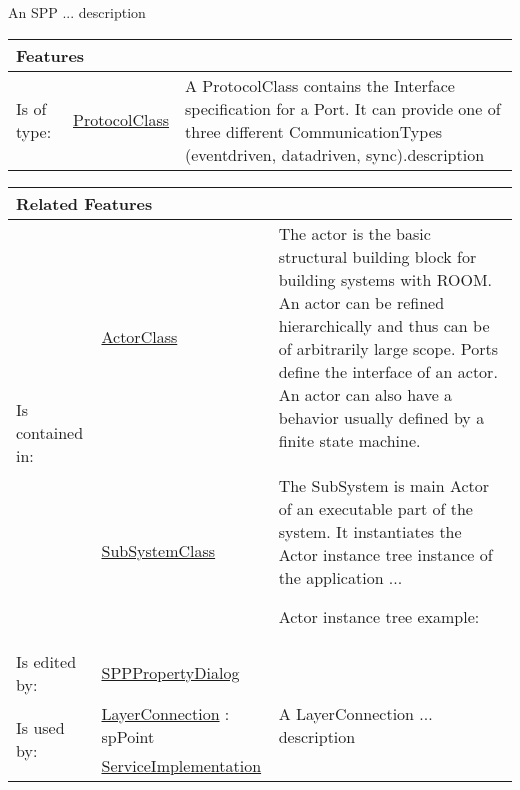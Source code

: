 			An SPP ... description
			
			
			\vspace{\baselineskip}
			\begingroup
			\renewcommand{\arraystretch}{1.8} %
			\parbox{\textwidth}{
			\begin{longtable}{l l p{}}
				\multicolumn{2}{l}{\textbf{\large Features}} & \\
				\hline
			Is of type: & \tabitem \hyperlink{ref:ProtocolClass}{ProtocolClass}  & A ProtocolClass contains the Interface specification for a Port. It can provide one of three different CommunicationTypes (eventdriven, datadriven, sync).description \\
			\hline
			\end{longtable}	
			}
			\endgroup
			\vspace{\baselineskip}
			
			\vspace{\baselineskip}
			\begingroup
			\renewcommand{\arraystretch}{1.8} %
			\parbox{\textwidth}{
			\begin{longtable}{l l p{}}
				\multicolumn{2}{l}{\textbf{\large Related Features}} & \\
				\hline
			\multirow{2}{*}{Is contained in:} & \tabitem \hyperlink{ref:ActorClass}{ActorClass}  & The actor is the basic structural building block for building systems with ROOM. An actor can be refined hierarchically and thus can be of arbitrarily large scope. Ports define the interface of an actor. An actor can also have a behavior usually defined by a finite state machine. \\
			& \tabitem \hyperlink{ref:SubSystemClass}{SubSystemClass}  & The SubSystem is main Actor of an executable part of the system. It instantiates the Actor instance tree instance of the application ...
				
				Actor instance tree example:
			 \\
			\hline
			Is edited by: & \tabitem \hyperlink{ref:SPPPropertyDialog}{SPPPropertyDialog}  & \\
			\hline
			\multirow{2}{*}{Is used by:} & \tabitem \hyperlink{ref:LayerConnection}{LayerConnection} : spPoint & A LayerConnection ... description \\
			& \tabitem \hyperlink{ref:ServiceImplementation}{ServiceImplementation}  &  \\
			\hline
			\end{longtable}	
			}
			\endgroup
			\vspace{\baselineskip}
			
